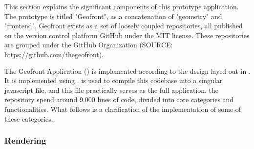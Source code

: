This section explains the significant components of this prototype application. 
The prototype is titled "Geofront", as a concatenation of "geometry" and "frontend".
Geofront exists as a set of loosely coupled repositories, all published on the version control platform GitHub under the MIT license. These repositories are grouped under the GitHub Organization  (SOURCE: https://github.com/thegeofront).

The Geofront Application () is implemented according to the design layed out in .
It is implemented using . 
 is used to compile this codebase into a singular javascript file, and this file practically serves as the full application. 
the repository spend around 9.000 lines of code, divided into core categories and functionalities.
What follows is a clarification of the implementation of some of these categories.

\subsubsection*{Rendering}

